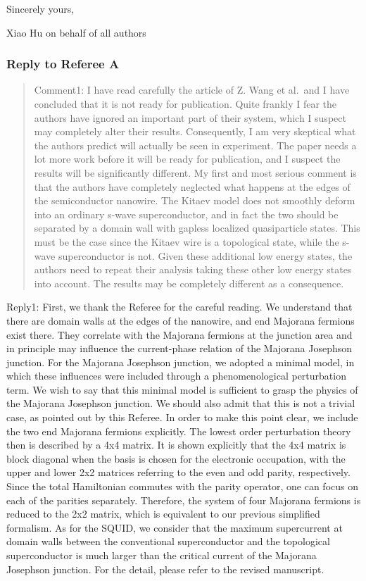 \documentclass[11pt]{article}
\begin{document}
Sincerely yours,

Xiao Hu on behalf of all authors

\hypertarget{reply-to-referee-a}{%
\subsubsection{Reply to Referee A}\label{reply-to-referee-a}}

\begin{quote}
Comment1: I have read carefully the article of Z. Wang et al.~and I have
concluded that it is not ready for publication. Quite frankly I fear the
authors have ignored an important part of their system, which I suspect
may completely alter their results. Consequently, I am very skeptical
what the authors predict will actually be seen in experiment. The paper
needs a lot more work before it will be ready for publication, and I
suspect the results will be significantly different. My first and most
serious comment is that the authors have completely neglected what
happens at the edges of the semiconductor nanowire. The Kitaev model
does not smoothly deform into an ordinary s-wave superconductor, and in
fact the two should be separated by a domain wall with gapless localized
quasiparticle states. This must be the case since the Kitaev wire is a
topological state, while the s-wave superconductor is not. Given these
additional low energy states, the authors need to repeat their analysis
taking these other low energy states into account. The results may be
completely different as a consequence.
\end{quote}

Reply1: First, we thank the Referee for the careful reading. We
understand that there are domain walls at the edges of the nanowire, and
end Majorana fermions exist there. They correlate with the Majorana
fermions at the junction area and in principle may influence the
current-phase relation of the Majorana Josephson junction. For the
Majorana Josephson junction, we adopted a minimal model, in which these
influences were included through a phenomenological perturbation term.
We wish to say that this minimal model is sufficient to grasp the
physics of the Majorana Josephson junction. We should also admit that
this is not a trivial case, as pointed out by this Referee. In order to
make this point clear, we include the two end Majorana fermions
explicitly. The lowest order perturbation theory then is described by a
4x4 matrix. It is shown explicitly that the 4x4 matrix is block diagonal
when the basis is chosen for the electronic occupation, with the upper
and lower 2x2 matrices referring to the even and odd parity,
respectively. Since the total Hamiltonian commutes with the parity
operator, one can focus on each of the parities separately. Therefore,
the system of four Majorana fermions is reduced to the 2x2 matrix, which
is equivalent to our previous simplified formalism. As for the SQUID, we
consider that the maximum supercurrent at domain walls between the
conventional superconductor and the topological superconductor is much
larger than the critical current of the Majorana Josephson junction. For
the detail, please refer to the revised manuscript.
\end{document}
